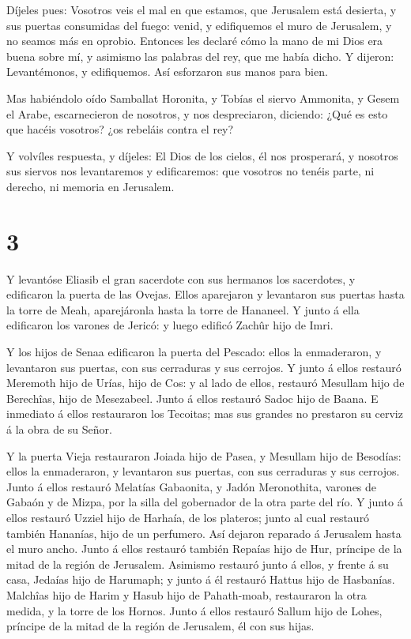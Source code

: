  Díjeles pues: Vosotros veis el mal en que estamos, que
Jerusalem está desierta, y sus puertas consumidas del fuego: venid, y
edifiquemos el muro de Jerusalem, y no seamos más en oprobio.
 Entonces les declaré cómo la mano de mi Dios era buena
sobre mí, y asimismo las palabras del rey, que me había dicho. Y
dijeron: Levantémonos, y edifiquemos. Así esforzaron sus manos para
bien.

 Mas habiéndolo oído Samballat Horonita, y Tobías el siervo
Ammonita, y Gesem el Arabe, escarnecieron de nosotros, y nos
despreciaron, diciendo: ¿Qué es esto que hacéis vosotros? ¿os rebeláis
contra el rey?

 Y volvíles respuesta, y díjeles: El Dios de los cielos, él
nos prosperará, y nosotros sus siervos nos levantaremos y edificaremos:
que vosotros no tenéis parte, ni derecho, ni memoria en Jerusalem.

\hypertarget{section-2}{%
\section{3}\label{section-2}}

 Y levantóse Eliasib el gran sacerdote con sus hermanos los
sacerdotes, y edificaron la puerta de las Ovejas. Ellos aparejaron y
levantaron sus puertas hasta la torre de Meah, aparejáronla hasta la
torre de Hananeel.  Y junto á ella edificaron los varones de
Jericó: y luego edificó Zachûr hijo de Imri.

 Y los hijos de Senaa edificaron la puerta del Pescado:
ellos la enmaderaron, y levantaron sus puertas, con sus cerraduras y sus
cerrojos.  Y junto á ellos restauró Meremoth hijo de Urías,
hijo de Cos: y al lado de ellos, restauró Mesullam hijo de Berechîas,
hijo de Mesezabeel. Junto á ellos restauró Sadoc hijo de Baana.
 E inmediato á ellos restauraron los Tecoitas; mas sus
grandes no prestaron su cerviz á la obra de su Señor.

 Y la puerta Vieja restauraron Joiada hijo de Pasea, y
Mesullam hijo de Besodías: ellos la enmaderaron, y levantaron sus
puertas, con sus cerraduras y sus cerrojos.  Junto á ellos
restauró Melatías Gabaonita, y Jadón Meronothita, varones de Gabaón y de
Mizpa, por la silla del gobernador de la otra parte del río.
 Y junto á ellos restauró Uzziel hijo de Harhaía, de los
plateros; junto al cual restauró también Hananías, hijo de un perfumero.
Así dejaron reparado á Jerusalem hasta el muro ancho.  Junto
á ellos restauró también Repaías hijo de Hur, príncipe de la mitad de la
región de Jerusalem.  Asimismo restauró junto á ellos, y
frente á su casa, Jedaías hijo de Harumaph; y junto á él restauró Hattus
hijo de Hasbanías.  Malchîas hijo de Harim y Hasub hijo de
Pahath-moab, restauraron la otra medida, y la torre de los Hornos.
 Junto á ellos restauró Sallum hijo de Lohes, príncipe de
la mitad de la región de Jerusalem, él con sus hijas.

